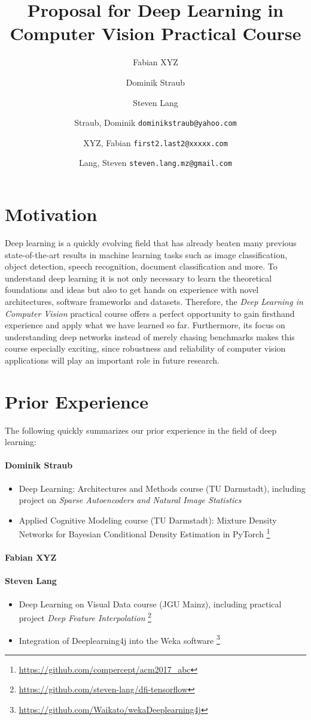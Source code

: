 \documentclass[11pt,english]{article}
\title{Proposal for Deep Learning in Computer Vision Practical Course}
\author{Fabian XYZ}
\author{Dominik Straub}
\author{Steven Lang}
\author{
	Straub, Dominik \texttt{dominikstraub@yahoo.com}
	\and
	XYZ, Fabian \texttt{first2.last2@xxxxx.com}
	\and
	Lang, Steven \texttt{steven.lang.mz@gmail.com}\\
}
\begin{document}
\maketitle
\section{Motivation}
Deep learning is a quickly evolving field that has already beaten many previous state-of-the-art results in machine learning tasks such as image classification, object detection, speech recognition, document classification and more. To understand deep learning it is not only necessary to learn the theoretical foundations and ideas but also to get hands on experience with novel architectures, software frameworks and datasets. Therefore, the \textit{Deep Learning in Computer Vision} practical course offers a perfect opportunity to gain firsthand experience and apply what we have learned so far. Furthermore, its focus on understanding deep networks instead of merely chasing benchmarks makes this course especially exciting, since robustness and reliability of computer vision applications will play an important role in future research.

\section{Prior Experience}
The following quickly summarizes our prior experience in the field of deep learning:

\paragraph{Dominik Straub}
\begin{itemize}
    \item Deep Learning: Architectures and Methods course (TU Darmstadt), including project on \textit{Sparse Autoencoders and Natural Image Statistics}
    \item Applied Cognitive Modeling course (TU Darmstadt): Mixture Density Networks for Bayesian Conditional Density Estimation in PyTorch \footnote{\url{https://github.com/compercept/acm2017_abc}}
\end{itemize}
\paragraph{Fabian XYZ}
\paragraph{Steven Lang}
\begin{itemize}
	\setlength\itemsep{-0.25em}
	\item Deep Learning on Visual Data course (JGU Mainz), including practical project \textit{Deep Feature Interpolation} \footnote{\url{https://github.com/steven-lang/dfi-tensorflow}}
	\item Integration of Deeplearning4j into the Weka software \footnote{\url{https://github.com/Waikato/wekaDeeplearning4j}}
\end{itemize}
\end{document}
